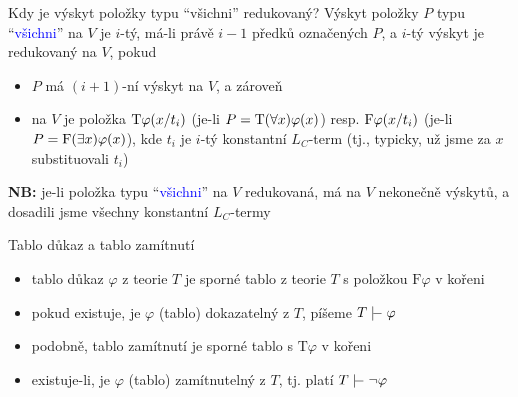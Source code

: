 \documentclass{beamer}
\begin{document}
\begin{frame}{Kdy je výskyt položky typu ``všichni'' redukovaný?}
    Výskyt položky $P$ typu ``\textcolor{blue}{všichni}'' na $V$ je \alert{$i$-tý}, má-li právě $i-1$ předků označených $P$, a \alert{$i$-tý výskyt je redukovaný} na $V$, pokud
    \begin{itemize}
        \item $P$ má $(i+1)$-ní výskyt na $V$, a zároveň
        \item na $V$ je položka \alert{$\mathrm{T}\varphi(x/t_i)$} (je-li $P=\mathrm{T}(\forall x)\varphi(x)$) resp. \alert{$\mathrm{F}\varphi(x/t_i)$} (je-li $P=\mathrm{F}(\exists x)\varphi(x)$), kde $t_i$ je $i$-tý konstantní $L_C$-term (tj., typicky, už jsme za $x$ substituovali $t_i$)
    \end{itemize} 


    \textbf{NB:} je-li položka typu ``\textcolor{blue}{všichni}'' na $V$ redukovaná, má na $V$ nekonečně výskytů, a dosadili jsme všechny konstantní $L_C$-termy

\end{frame}


\begin{frame}{Tablo důkaz a tablo zamítnutí}

    \begin{itemize}
        \item \alert{tablo důkaz}  $\varphi$ z teorie $T$ je \alert{sporné} tablo z teorie $T$ s položkou $\mathrm{F}\varphi$ v kořeni
        \item pokud existuje, je $\varphi$ \alert{(tablo) dokazatelný} z $T$, píšeme \alert{$T\proves\varphi$}
        \item podobně, \alert{tablo zamítnutí} je sporné tablo s $\mathrm{T}\varphi$ v kořeni
        \item existuje-li, je $\varphi$ \alert{(tablo) zamítnutelný} z $T$, tj. platí \alert{$T\proves\neg\varphi$}
    \end{itemize}

\end{frame}
\end{document}
